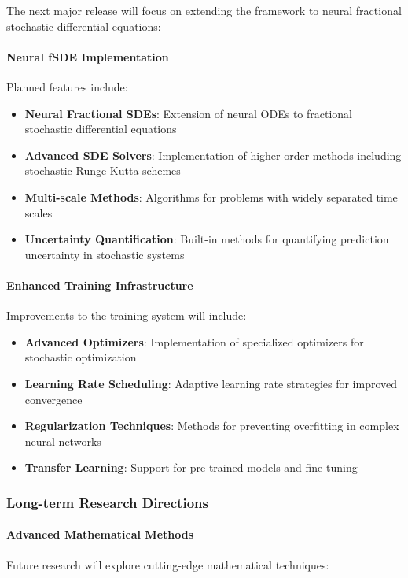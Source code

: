 The next major release will focus on extending the framework to neural fractional stochastic differential equations:

\paragraph{Neural fSDE Implementation}
Planned features include:

\begin{itemize}
    \item \textbf{Neural Fractional SDEs}: Extension of neural ODEs to fractional stochastic differential equations
    \item \textbf{Advanced SDE Solvers}: Implementation of higher-order methods including stochastic Runge-Kutta schemes
    \item \textbf{Multi-scale Methods}: Algorithms for problems with widely separated time scales
    \item \textbf{Uncertainty Quantification}: Built-in methods for quantifying prediction uncertainty in stochastic systems
\end{itemize}

\paragraph{Enhanced Training Infrastructure}
Improvements to the training system will include:

\begin{itemize}
    \item \textbf{Advanced Optimizers}: Implementation of specialized optimizers for stochastic optimization
    \item \textbf{Learning Rate Scheduling}: Adaptive learning rate strategies for improved convergence
    \item \textbf{Regularization Techniques}: Methods for preventing overfitting in complex neural networks
    \item \textbf{Transfer Learning}: Support for pre-trained models and fine-tuning
\end{itemize}

\subsubsection{Long-term Research Directions}

\paragraph{Advanced Mathematical Methods}
Future research will explore cutting-edge mathematical techniques:

